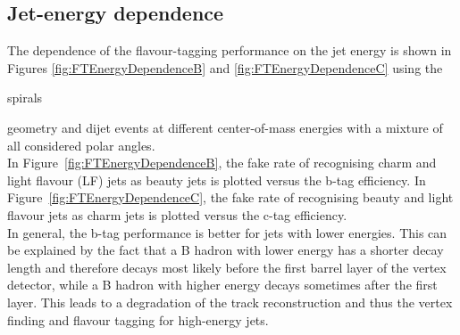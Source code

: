 \subsection{Jet-energy dependence}
The dependence of the flavour-tagging performance on the jet energy is shown in Figures \ref{fig:FTEnergyDependenceB} and \ref{fig:FTEnergyDependenceC} using the \begin{it}spirals\end{it} geometry and dijet events at different center-of-mass energies with a mixture of all considered polar angles. \\
In Figure~\ref{fig:FTEnergyDependenceB}, the fake rate of recognising charm and light flavour (LF) jets as beauty jets is plotted versus the b-tag efficiency. In Figure~\ref{fig:FTEnergyDependenceC}, the fake rate of recognising beauty and light flavour jets as charm jets is plotted versus the c-tag efficiency. \\
In general, the b-tag performance is better for jets with lower
energies. This can be explained by the fact that a B hadron with lower
energy has a shorter decay length and therefore decays most likely
before the first barrel layer of the vertex detector, while a B hadron with higher energy
decays sometimes after the first layer. This leads to a degradation of
the track reconstruction and thus the vertex finding and flavour
tagging for high-energy jets.

